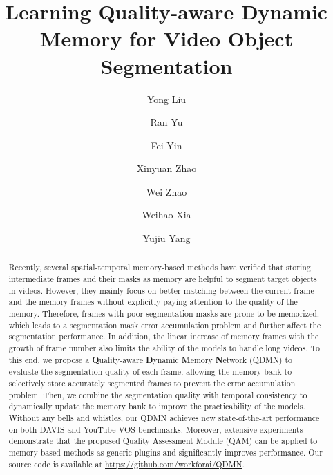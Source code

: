 \documentclass[runningheads]{llncs}
\begin{document}
\pagestyle{headings}
\mainmatter
\def\ECCVSubNumber{4636}  

\title{Learning Quality-aware Dynamic Memory for Video Object Segmentation} 

\author{Yong Liu\and
Ran Yu \and
Fei Yin \and
Xinyuan Zhao \and
Wei Zhao \and
Weihao Xia \and
Yujiu Yang
}
\maketitle

\let\thefootnote\relax{}
\let\thefootnote\relax{}

\begin{abstract}
 
Recently, several spatial-temporal memory-based methods have verified that storing intermediate frames and their masks as memory are helpful to segment target objects in videos. However, they mainly focus on better matching between the current frame and the memory frames without explicitly paying attention to the quality of the memory. Therefore, frames with poor segmentation masks are prone to be memorized, which leads to a segmentation mask error accumulation problem and further affect the segmentation performance. In addition, the linear increase of memory frames with the growth of frame number also limits the ability of the models to handle long videos. To this end, we propose a \textbf{Q}uality-aware \textbf{D}ynamic \textbf{M}emory \textbf{N}etwork (QDMN) to evaluate the segmentation quality of each frame, allowing the memory bank to selectively store accurately segmented frames to prevent the error accumulation problem. Then, we combine the segmentation quality with temporal consistency to dynamically update the memory bank to improve the practicability of the models. Without any bells and whistles, our QDMN achieves new state-of-the-art performance on both DAVIS and YouTube-VOS benchmarks. Moreover, extensive experiments demonstrate that the proposed Quality Assessment Module (QAM) can be applied to memory-based methods as generic plugins and significantly improves performance.
Our source code is available at \textcolor{magenta}{\url{https://github.com/workforai/QDMN}}.





 \end{abstract}
\end{document}
